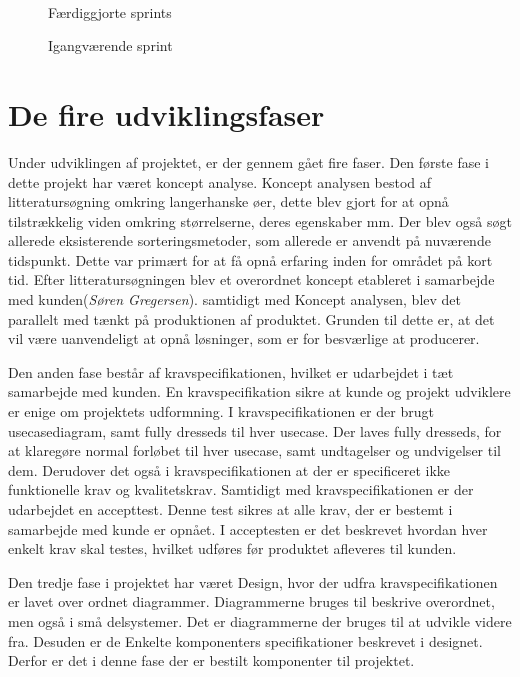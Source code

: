 \begin{figure}[htbp]
\begin{minipage}[b]{0.48\textwidth}
\end{minipage} \\ %
\begin{minipage}[t]{0.48\textwidth}
\caption{Færdiggjorte sprints} %
\label{fig:pt_sprints}
\end{minipage} \hfill
\begin{minipage}[t]{0.48\textwidth}
\caption{Igangværende sprint} %
\label{fig:pt_currentsprint}
\end{minipage}
\end{figure}

\section{De fire udviklingsfaser}
Under udviklingen af projektet, er der gennem gået fire faser. Den første fase i dette projekt har været koncept analyse. Koncept analysen bestod af litteratursøgning omkring langerhanske øer, dette blev gjort for at opnå tilstrækkelig viden omkring størrelserne, deres egenskaber mm. Der blev også søgt allerede eksisterende sorteringsmetoder, som allerede er anvendt på nuværende tidspunkt. Dette var primært for at få opnå erfaring inden for området på kort tid. Efter litteratursøgningen blev et overordnet koncept etableret i samarbejde med kunden(\textit{Søren Gregersen}). samtidigt med Koncept analysen, blev det parallelt med tænkt på produktionen af produktet. Grunden til dette er, at det vil være uanvendeligt at opnå løsninger, som er for besværlige at producerer. 

Den anden fase består af kravspecifikationen, hvilket er udarbejdet i tæt samarbejde med kunden. En kravspecifikation sikre at kunde og projekt udviklere er enige om projektets udformning. I kravspecifikationen er der brugt usecasediagram, samt fully dresseds til hver usecase. Der laves fully dresseds, for at klaregøre normal forløbet til hver usecase, samt undtagelser og undvigelser til dem. Derudover det også i kravspecifikationen at der er specificeret ikke funktionelle krav og kvalitetskrav. Samtidigt med kravspecifikationen er der udarbejdet en accepttest. Denne test sikres at alle krav, der er bestemt i samarbejde med kunde er opnået. I acceptesten er det beskrevet hvordan hver enkelt krav skal testes, hvilket udføres før produktet afleveres til kunden.

Den tredje fase i projektet har været Design, hvor der udfra kravspecifikationen er lavet over ordnet diagrammer. Diagrammerne bruges til beskrive overordnet, men også i små delsystemer. Det er diagrammerne der bruges til at udvikle videre fra. Desuden er de Enkelte komponenters specifikationer beskrevet i designet. Derfor er det i denne fase der er bestilt komponenter til projektet. 

